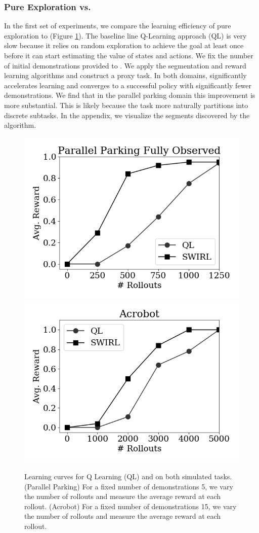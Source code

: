 \subsubsection{Pure Exploration vs. \hirl}
In the first set of experiments, we compare the learning efficiency of pure exploration to \hirl (Figure \ref{exp:pe}).  The baseline line Q-Learning approach (QL) is very slow because it relies on random exploration to achieve the goal at least once  before  it  can  start  estimating  the  value  of  states  and actions. We fix the number of initial demonstrations provided to \hirl. We apply the segmentation and reward learning algorithms and construct a proxy task. In both domains, \hirl significantly accelerates learning and converges to a successful policy with significantly fewer demonstrations. We find that in the parallel parking domain this improvement is more substantial. This is likely because the task more naturally partitions into discrete subtasks. In the appendix, we visualize the segments discovered by the algorithm.

\begin{figure}[ht!]
\centering
 \includegraphics[width=0.48\columnwidth]{swirl-experiments/ppfo-rl1.png}
 \includegraphics[width=0.48\columnwidth]{swirl-experiments/ppfo-rl2.png}
 \caption{Learning curves for Q Learning (QL) and \hirl on both simulated tasks. (Parallel Parking) For a fixed number of demonstrations 5, we vary the number of rollouts and measure the average reward at each rollout. (Acrobot) For a fixed number of demonstrations 15, we vary the number of rollouts and measure the average reward at each rollout. \label{exp:pe}}
\end{figure}


